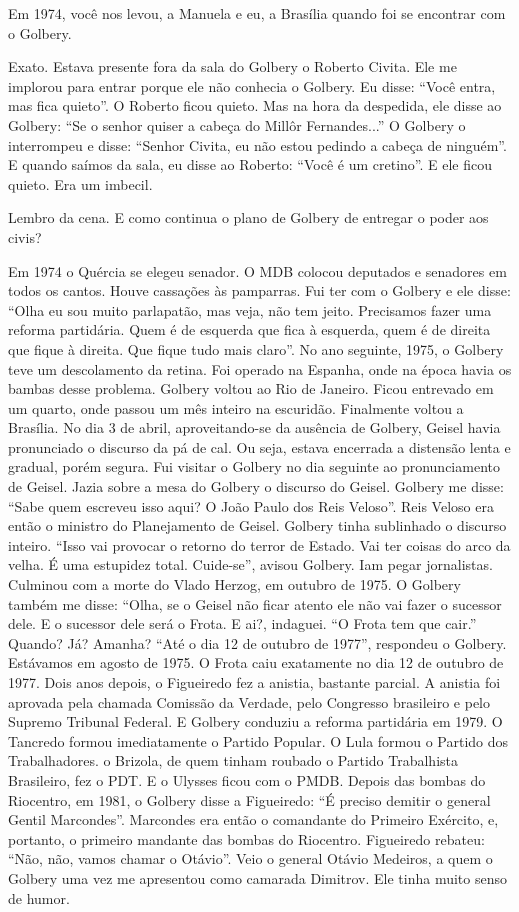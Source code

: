 \falaG Em 1974, você nos levou, a Manuela e eu, a Brasília quando foi se
encontrar com o Golbery.

\falaM Exato. Estava presente fora da sala do Golbery o Roberto Civita. Ele
me implorou para entrar porque ele não conhecia o Golbery. Eu disse:
``Você entra, mas fica quieto''. O Roberto ficou quieto. Mas na hora da
despedida, ele disse ao Golbery: ``Se o senhor quiser a cabeça do Millôr
Fernandes...'' O Golbery o interrompeu e disse: ``Senhor Civita, eu não
estou pedindo a cabeça de ninguém''. E quando saímos da sala, eu disse
ao Roberto: ``Você é um cretino''. E ele ficou quieto. Era um imbecil.

\falaG Lembro da cena. E como continua o plano de Golbery de entregar o
poder aos civis?

\falaM Em 1974 o Quércia se elegeu senador. O MDB colocou deputados e
senadores em todos os cantos. Houve cassações às pamparras. Fui ter com
o Golbery e ele disse: ``Olha eu sou muito parlapatão, mas veja, não tem
jeito. Precisamos fazer uma reforma partidária. Quem é de esquerda que
fica à esquerda, quem é de direita que fique à direita. Que fique tudo
mais claro''. No ano seguinte, 1975, o Golbery teve um descolamento da
retina. Foi operado na Espanha, onde na época havia os bambas desse
problema. Golbery voltou ao Rio de Janeiro. Ficou entrevado em um
quarto, onde passou um mês inteiro na escuridão. Finalmente voltou a
Brasília. No dia 3 de abril, aproveitando-se da ausência de Golbery,
Geisel havia pronunciado o discurso da pá de cal. Ou seja, estava
encerrada a distensão lenta e gradual, porém segura. Fui visitar o
Golbery no dia seguinte ao pronunciamento de Geisel. Jazia sobre a mesa
do Golbery o discurso do Geisel. Golbery me disse: ``Sabe quem escreveu
isso aqui? O João Paulo dos Reis Veloso''. Reis Veloso era então o
ministro do Planejamento de Geisel. Golbery tinha sublinhado o discurso
inteiro. ``Isso vai provocar o retorno do terror de Estado. Vai ter
coisas do arco da velha. É uma estupidez total. Cuide-se'', avisou
Golbery. Iam pegar jornalistas. Culminou com a morte do Vlado Herzog, em
outubro de 1975. O Golbery também me disse: ``Olha, se o Geisel não
ficar atento ele não vai fazer o sucessor dele. E o sucessor dele será o
Frota. E ai?, indaguei. ``O Frota tem que cair.'' Quando? Já? Amanha?
``Até o dia 12 de outubro de 1977'', respondeu o Golbery. Estávamos em
agosto de 1975. O Frota caiu exatamente no dia 12 de outubro de 1977.
Dois anos depois, o Figueiredo fez a anistia, bastante parcial. A
anistia foi aprovada pela chamada Comissão da Verdade, pelo Congresso
brasileiro e pelo Supremo Tribunal Federal. E Golbery conduziu a reforma
partidária em 1979. O Tancredo formou imediatamente o Partido Popular. O
Lula formou o Partido dos Trabalhadores. o Brizola, de quem tinham
roubado o Partido Trabalhista Brasileiro, fez o PDT. E o Ulysses ficou
com o PMDB. Depois das bombas do Riocentro, em 1981, o Golbery disse a
Figueiredo: ``É preciso demitir o general Gentil Marcondes''. Marcondes
era então o comandante do Primeiro Exército, e, portanto, o primeiro
mandante das bombas do Riocentro. Figueiredo rebateu: ``Não, não, vamos
chamar o Otávio''. Veio o general Otávio Medeiros, a quem o Golbery uma
vez me apresentou como camarada Dimitrov. Ele tinha muito senso de
humor.

